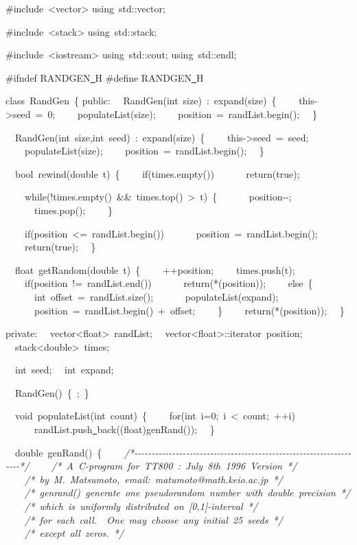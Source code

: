 {\ttfamily \raggedright \footnotesize
\#include\ <{}vector>{}
using\ std::vector;

\#include\ <{}stack>{}
using\ std::stack;

\#include\ <{}iostream>{}
using\ std::cout;
using\ std::endl;

\#ifndef RANDGEN\underline\ H
\#define RANDGEN\underline\ H

class\ RandGen\ \{
public:
\ \ RandGen(int\ size)\ :\ expand(size)\ \{
\ \ \ \ this-{}>{}seed\ =\ 0;
\ \ \ \ populateList(size);
\ \ \ \ position\ =\ randList.begin();
\ \ \}

\ \ RandGen(int\ size,int\ seed)\ :\ expand(size)\ \{
\ \ \ \ this-{}>{}seed\ =\ seed;
\ \ \ \ populateList(size);
\ \ \ \ position\ =\ randList.begin();
\ \ \}

\ \ bool\ rewind(double\ t)\ \{
\ \ \ \ if(times.empty())
\ \ \ \ \ \ return(true);

\ \ \ \ while(!times.empty()\ \&\&\ times.top()\ >{}\ t)\ \{
\ \ \ \ \ \ position-{}-{};
\ \ \ \ \ \ times.pop();
\ \ \ \ \}

\ \ \ \ if(position\ <{}=\ randList.begin())
\ \ \ \ \ \ position\ =\ randList.begin();
\ \ \ \ return(true);
\ \ \}

\ \ float\ getRandom(double\ t)\ \{
\ \ \ \ ++position;
\ \ \ \ times.push(t);
\ \ \ \ if(position\ !=\ randList.end())
\ \ \ \ \ \ return(*(position));
\ \ \ \ else\ \{
\ \ \ \ \ \ int\ offset\ =\ randList.size();
\ \ \ \ \ \ populateList(expand);
\ \ \ \ \ \ position\ =\ randList.begin()\ +\ offset;
\ \ \ \ \}
\ \ \ \ return(*(position));
\ \ \}

private:
\ \ vector<{}float>{}\ randList;
\ \ vector<{}float>{}::iterator\ position;
\ \ stack<{}double>{}\ times;

\ \ int\ seed;
\ \ int\ expand;

\ \ RandGen()\ \{\ ;\ \}

\ \ void\ populateList(int\ count)\ \{
\ \ \ \ for(int\ i=0;\ i\ <{}\ count;\ ++i)
\ \ \ \ \ \ randList.push\underline\ back((float)genRand());
\ \ \}

\ \ double\ genRand()\ \{
\ \ \ \ \textsl{/*-{}-{}-{}-{}-{}-{}-{}-{}-{}-{}-{}-{}-{}-{}-{}-{}-{}-{}-{}-{}-{}-{}-{}-{}-{}-{}-{}-{}-{}-{}-{}-{}-{}-{}-{}-{}-{}-{}-{}-{}-{}-{}-{}-{}-{}-{}-{}-{}-{}-{}-{}-{}-{}-{}-{}-{}-{}-{}-{}-{}-{}-{}-{}-{}-{}-{}-{}*/}
\ \ \ \ \textsl{/*\ A\ C-{}program\ for\ TT800\ :\ July\ 8th\ 1996\ Version\ */}
\ \ \ \ \textsl{/*\ by\ M.\ Matsumoto,\ email:\ matumoto@math.keio.ac.jp\ */}
\ \ \ \ \textsl{/*\ genrand()\ generate\ one\ pseudorandom\ number\ with\ double\ precision\ */}
\ \ \ \ \textsl{/*\ which\ is\ uniformly\ distributed\ on\ [0,1]-{}interval\ */}
\ \ \ \ \textsl{/*\ for\ each\ call.\ \ One\ may\ choose\ any\ initial\ 25\ seeds\ */}
\ \ \ \ \textsl{/*\ except\ all\ zeros.\ */}

}

